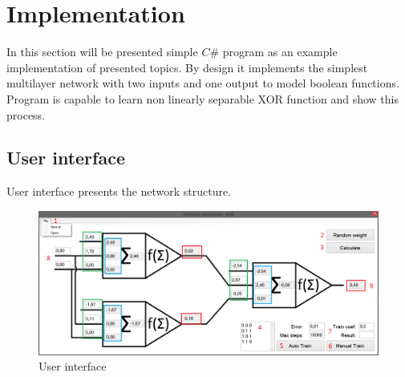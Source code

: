 \section{Implementation}
\label{Implementation}

In this section will be presented simple $C\#$ program as an example implementation of presented topics.
By design it implements the simplest multilayer network with two inputs and one output to model boolean functions.
Program is capable to learn non linearly separable XOR function and show this process.

\subsection{User interface}
\label{UserInterface}

User interface presents the network structure.

\begin{figure}[!h]
    \centering
    \includegraphics[scale=0.45]{Media/UI_numbers.png}
    \caption{User interface}
    \label{fig:UInumbers}
\end{figure}

